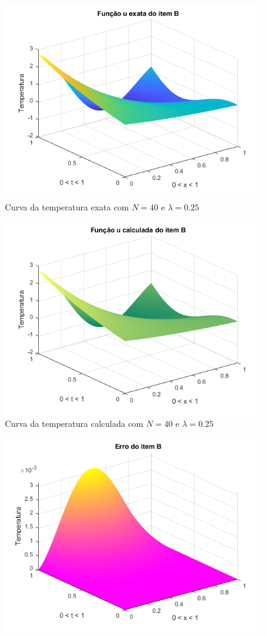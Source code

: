 \documentclass[12pt]{article}
\begin{document}
\begin{spacing}{1.5}
\begin{figure}
    \centering
    \includegraphics[width=0.8\linewidth]{Primeira_Tarefa/ItemB/n40_lambda0-25_exata.png}
    \caption{Curva da temperatura exata com $N=40$ e $\lambda=0.25$}
    \label{fig:B_n40lambda0-25_exata}
\end{figure}
\begin{figure}
    \centering
    \includegraphics[width=0.8\linewidth]{Primeira_Tarefa/ItemB/n40_lambda0-25_calc.png}
    \caption{Curva da temperatura calculada com $N=40$ e $\lambda=0.25$}
    \label{fig:B_n40lambda0-25_calc}
\end{figure}
\begin{figure}
    \centering
    \includegraphics[width=0.8\linewidth]{Primeira_Tarefa/ItemB/n40_lambda0-25_erro.png}

\end{figure}
\end{spacing}
\end{document}
